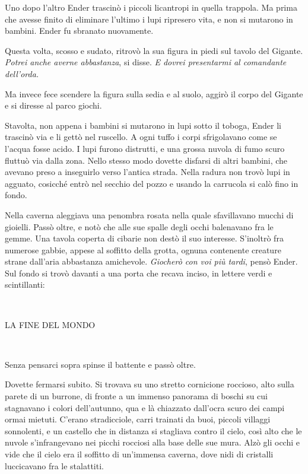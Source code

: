 {Uno dopo l'altro Ender trascinò i piccoli licantropi in quella
	trappola. Ma prima che avesse finito di eliminare l'ultimo i lupi
	ripresero vita, e non si mutarono in bambini. Ender fu sbranato
	nuovamente.}

{Questa volta, scosso e sudato, ritrovò la sua figura in piedi sul
	tavolo del Gigante. \emph{Potrei anche averne abbastanza}, \emph{} si
	disse. \emph{E dovrei presentarmi al comandante dell'orda.}}

{Ma invece fece scendere la figura sulla sedia e al suolo, aggirò il
	corpo del Gigante e si diresse al parco giochi.}

{Stavolta, non appena i bambini si mutarono in lupi sotto il toboga,
	Ender li trascinò via e li gettò nel ruscello. A ogni tuffo i corpi
	sfrigolavano come se l'acqua fosse acido. I lupi furono distrutti, e una
	grossa nuvola di fumo scuro fluttuò via dalla zona. Nello stesso modo
	dovette disfarsi di altri bambini, che avevano preso a inseguirlo verso
	l'antica strada. Nella radura non trovò lupi in agguato, cosicché entrò
	nel secchio del pozzo e usando la carrucola si calò fino in fondo.}

{Nella caverna aleggiava una penombra rosata nella quale sfavillavano
	mucchi di gioielli. Passò oltre, e notò che alle sue spalle degli occhi
	balenavano fra le gemme. Una tavola coperta di cibarie non destò il suo
	interesse. S'inoltrò fra numerose gabbie, appese al soffitto della
	grotta, ognuna contenente creature strane dall'aria abbastanza
	amichevole. \emph{Giocherò con voi più tardi}, \emph{} pensò Ender. Sul
	fondo si trovò davanti a una porta che recava inciso, in lettere verdi e
	scintillanti:}

{~}

\begin{center}
	{LA FINE DEL MONDO}
\end{center}

{~}

{Senza pensarci sopra spinse il battente e passò oltre.}

{Dovette fermarsi subito. Si trovava su uno stretto cornicione roccioso,
	alto sulla parete di un burrone, di fronte a un immenso panorama di
	boschi su cui stagnavano i colori dell'autunno, qua e là chiazzato
	dall'ocra scuro dei campi ormai mietuti. C'erano stradicciole, carri
	trainati da buoi, piccoli villaggi sonnolenti, e un castello che in
	distanza si stagliava contro il cielo, così alto che le nuvole
	s'infrangevano nei picchi rocciosi alla base delle sue mura. Alzò gli
	occhi e vide che il cielo era il soffitto di un'immensa caverna, dove
	nidi di cristalli luccicavano fra le stalattiti.}

